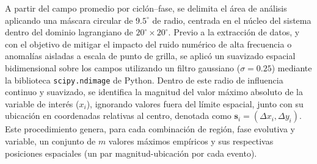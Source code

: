 A partir del campo promedio por ciclón--fase, se delimita el área de análisis aplicando una máscara circular de $9.5^{\circ}$ de radio, centrada en el núcleo del sistema dentro del dominio lagrangiano de $20^{\circ} \times 20^{\circ}$. Previo a la extracción de datos, y con el objetivo de mitigar el impacto del ruido numérico de alta frecuencia o anomalías aisladas a escala de punto de grilla, se aplicó un suavizado espacial bidimensional sobre los campos utilizando un filtro gaussiano ($\sigma = 0.25$) mediante la biblioteca \texttt{scipy.ndimage} de Python. Dentro de este radio de influencia continuo y suavizado, se identifica la magnitud del valor máximo absoluto de la variable de interés ($x_i$), ignorando valores fuera del límite espacial, junto con su ubicación en coordenadas relativas al centro, denotada como $\mathbf{s}_i=(\Delta x_i,\Delta y_i)$. Este procedimiento genera, para cada combinación de región, fase evolutiva y variable, un conjunto de $m$ valores máximos empíricos y sus respectivas posiciones espaciales (un par magnitud-ubicación por cada evento).

